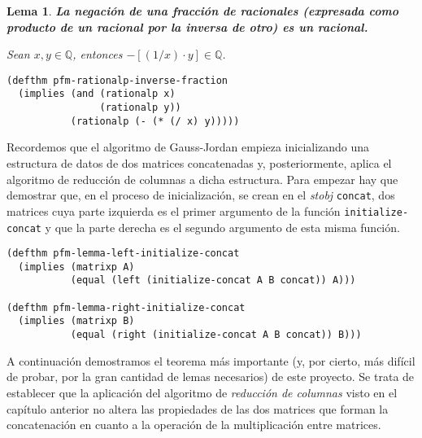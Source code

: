 \documentclass[a4paper,10pt]{article}
\newcommand{\Q}[1]{#1 \in \mathbb{Q}}
\newtheorem{lema}{{Lema}}
\begin{document}
\par \vspace{16pt}

\begin{lema} \textbf{La negación de una fracción de racionales (expresada como producto de un racional por la inversa de otro) es un racional.}\vspace{8pt}\par
Sean $\Q{x,y}$, entonces $\Q{-[(1/x)\cdot y]}$.
\end{lema}

\begin{lstlisting}[language=clips]
(defthm pfm-rationalp-inverse-fraction
  (implies (and (rationalp x)
                (rationalp y))
           (rationalp (- (* (/ x) y)))))
\end{lstlisting}

\par \vspace{16pt}

Recordemos que el algoritmo de Gauss-Jordan empieza inicializando una estructura de datos de dos matrices concatenadas y, posteriormente, aplica el algoritmo de reducción de columnas a dicha estructura. Para empezar hay que demostrar que, en el proceso de inicialización, se crean en el \emph{stobj} \texttt{concat}, dos matrices cuya parte izquierda es el primer argumento de la función \texttt{initialize-concat} y que la parte derecha es el segundo argumento de esta misma función.

\par \vspace{10pt}

\begin{lstlisting}[language=clips]
(defthm pfm-lemma-left-initialize-concat
  (implies (matrixp A) 
           (equal (left (initialize-concat A B concat)) A)))

(defthm pfm-lemma-right-initialize-concat
  (implies (matrixp B) 
           (equal (right (initialize-concat A B concat)) B)))
\end{lstlisting}

\par \vspace{16pt}

A continuación demostramos el teorema más importante (y, por cierto, más difícil de probar, por la gran cantidad de lemas necesarios) de este proyecto. Se trata de establecer que la aplicación del algoritmo de \emph{reducción de columnas} visto en el capítulo anterior no altera las propiedades de las dos matrices que forman la concatenación en cuanto a la operación de la multiplicación entre matrices.
\end{document}
